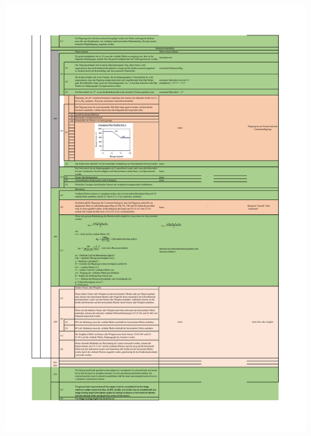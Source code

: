 \begin{table}[H]
\centering
\includegraphics[width=1.0\textwidth, trim={19mm 19mm 19mm 19mm}, clip]{bilder/Tabellen/MPP_Konstruktion_6.pdf}
\end{table}

